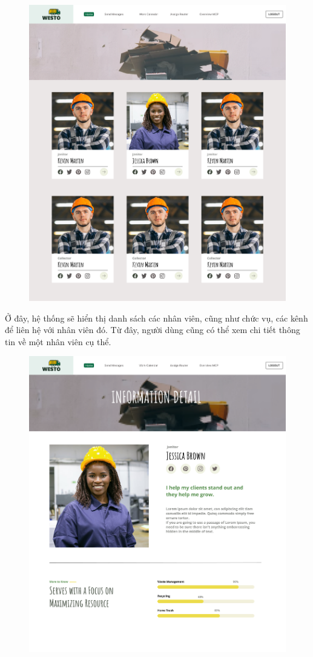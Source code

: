 \documentclass[a4paper]{article}
\begin{document}
\begin{enumerate}
\begin{figure}[!h]
        \centering
        \includegraphics[width = 5in]{Image/home-stafflist.png}
    \end{figure}
    \newpage
    Ở đây, hệ thống sẽ hiển thị danh sách các nhân viên, cũng như chức vụ, các kênh để liên hệ với nhân viên đó. Từ đây, người dùng cũng có thể xem chi tiết thông tin về một nhân viên cụ thể.\\
    \newpage
    \begin{figure}[!h]
        \centering
        \includegraphics[width = 5in]{Image/home-infor-detail.png}

\end{figure}
\end{enumerate}
\end{document}
